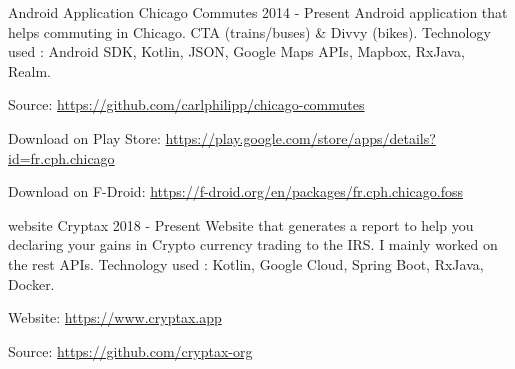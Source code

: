 

\begin{cventries}

  \projectentry
    {Android Application} %
    {Chicago Commutes} %
    {2014 - Present} %
    {Android application that helps commuting in Chicago. CTA (trains/buses) \& Divvy (bikes).\linebreak
Technology used : Android SDK, Kotlin, JSON, Google Maps APIs, Mapbox, RxJava, Realm.
    }
    {
    \begin{projectdetails}
        	\item Source: \href{https://github.com/carlphilipp/chicago-commutes}{https://github.com/carlphilipp/chicago-commutes}
		\item Download on Play Store: \href{https://play.google.com/store/apps/details?id=fr.cph.chicago}{https://play.google.com/store/apps/details?id=fr.cph.chicago}
		\item Download on F-Droid: \href{https://f-droid.org/en/packages/fr.cph.chicago.foss}{https://f-droid.org/en/packages/fr.cph.chicago.foss}
      \end{projectdetails}
   }

  \vspace{-2.0mm}
  \projectentry
    {website} %
    {Cryptax} %
    {2018 - Present} %
    {Website that generates a report to help you declaring your gains in Crypto currency trading to the IRS. I mainly worked on the rest APIs.\linebreak
    Technology used : Kotlin, Google Cloud, Spring Boot, RxJava, Docker.
    }
    {
    \begin{projectdetails}
        	\item Website: \href{https://www.cryptax.app}{https://www.cryptax.app}
		\item Source: \href{https://github.com/cryptax-org}{https://github.com/cryptax-org}
      \end{projectdetails}
    }


\end{cventries}
